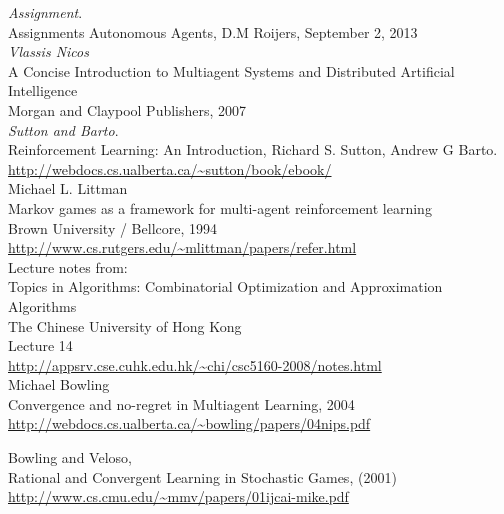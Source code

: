 \documentclass[a4paper,12pt]{article}
\begin{document}
\thebibliography{}
  \emph{Assignment}.\\
  Assignments Autonomous Agents, D.M Roijers, September 2, 2013 \\

	\emph{Vlassis Nicos} \\
	A Concise Introduction to Multiagent Systems and Distributed Artificial Intelligence \\
	Morgan and Claypool Publishers, 2007 \\

  \emph{Sutton and Barto}.\\
  Reinforcement Learning: An Introduction, Richard S. Sutton, Andrew G Barto. \\
  \url{http://webdocs.cs.ualberta.ca/~sutton/book/ebook/} \\
 
 Michael L. Littman \\
 Markov games as a framework for multi-agent reinforcement learning \\
 Brown University / Bellcore, 1994 \\
 \url{http://www.cs.rutgers.edu/~mlittman/papers/refer.html} \\
 
 Lecture notes from: \\ 
 Topics in Algorithms: Combinatorial Optimization and Approximation Algorithms \\
 The Chinese University of Hong Kong \\
 Lecture 14 \\
 \url{http://appsrv.cse.cuhk.edu.hk/~chi/csc5160-2008/notes.html} \\
 
 Michael Bowling \\
 Convergence and no-regret in Multiagent Learning, 2004 \\
 \url{http://webdocs.cs.ualberta.ca/~bowling/papers/04nips.pdf}

 Bowling and Veloso, \\
 Rational and Convergent Learning in Stochastic Games, (2001) \\
\url{http://www.cs.cmu.edu/~mmv/papers/01ijcai-mike.pdf}
\end{document}
